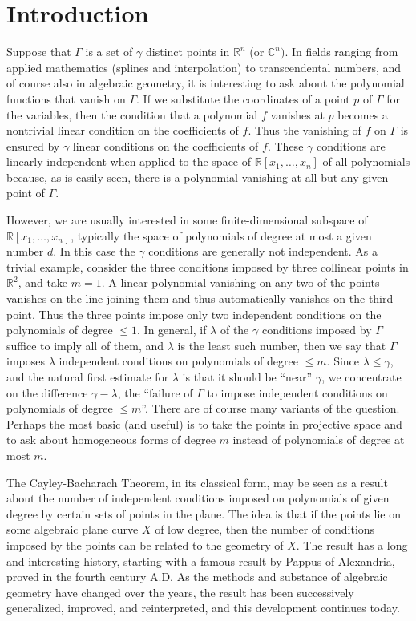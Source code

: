 \documentclass{bull-l}
\theoremstyle{pplain}
\theoremstyle{definition}
\begin{document}
\section*{Introduction}
Suppose that $\Gamma$ is a set of $\gamma$ distinct points in $\mathbb{R}^n$
(or $\mathbb{C}^n)$.  In fields ranging from applied mathematics (splines and 
interpolation) to transcendental numbers, and of course also in algebraic
geometry, it is interesting to ask about the polynomial functions that vanish
on $\Gamma$.  If we substitute the coordinates of a point $p$ of $\Gamma$ for
the variables, then the condition that a polynomial $f$ vanishes at $p$ becomes
a nontrivial linear condition on the coefficients of $f$.  Thus the vanishing
of $f$ on $\Gamma$ is ensured by $\gamma$ linear conditions on the coefficients
of $f$.  These $\gamma$ conditions are linearly independent when applied to the
space of $\mathbb{R}[x_1,\dots,x_n]$ of all polynomials because, as is easily
seen, there is a polynomial vanishing at all but any given point of $\Gamma$.

However, we are usually interested in some finite-dimensional subspace of 
\linebreak  
$\mathbb{R}[x_1,\dots,x_n]$, typically the space of polynomials of degree at
most a given number $d$.  In this case the $\gamma$ conditions are generally
not independent.  As a trivial example, consider the three conditions imposed by
three collinear points in $\mathbb{R}^2$, and take $m=1$.  A linear polynomial
vanishing on any two of the points vanishes on the line joining them and thus
automatically vanishes on the third point.  Thus the three points impose only
two independent conditions on the polynomials of degree $\le 1$.  In general,
if $\lambda$ of the $\gamma$ conditions imposed by $\Gamma$ suffice to imply
all of them, and $\lambda$ is the least such number, then we say that $\Gamma$
imposes $\lambda$ independent conditions on polynomials of degree $\le m$. 
Since $\lambda\le \gamma$, and the natural first estimate for $\lambda$
is that it should be ``near'' $\gamma$, we concentrate on the
difference $\gamma-\lambda$, the ``failure of $\Gamma$ to impose independent 
conditions on polynomials of degree $\le m$''.  There are of course many
variants of the question.  Perhaps the most basic (and useful) is to take the 
points in projective space and to ask about homogeneous forms of degree $m$
instead of polynomials of degree at most $m$.

The Cayley-Bacharach Theorem, in its classical form, may be seen as a result
about the number of independent  conditions imposed on polynomials of given
degree by certain sets of points in the plane.  The idea is that if the points
lie on some algebraic plane curve $X$ of low degree, then the number of 
conditions imposed by the points can be related to the geometry of $X$.  The
result has a long and interesting history, starting with a famous result by
Pappus of Alexandria, proved in the fourth century A.D.    As the methods and
substance of algebraic geometry have changed over the years, the result has
been successively generalized, improved, and reinterpreted, and this
development continues today.
\end{document}
